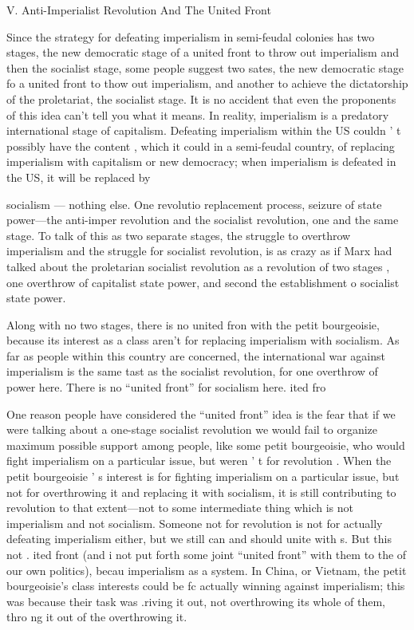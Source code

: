 \documentclass[12pt, titlepage]{article}
\begin{document}
{\begin{spacing}{1.10}
V. Anti-Imperialist Revolution And The United Front

Since the strategy for defeating imperialism in semi-feudal colonies has two stages, the new democratic stage of a united front to throw out imperialism and then the socialist stage, some people suggest two sates, the new democratic stage fo a united front to thow out imperialism, and another to achieve the dictatorship of the proletariat, the socialist stage. It is no accident that even the proponents of this idea can't tell you what it means. In reality, imperialism is a predatory international stage of capitalism. Defeating imperialism within the US couldn ' t possibly have the content , which it could in a semi-feudal country, of replacing imperialism with capitalism or new democracy; when imperialism is defeated in the US, it will be replaced by

socialism — nothing else. One revolutio replacement process, seizure of state power—the anti-imper revolution and the socialist
revolution, one and the same stage. To talk of this as two separate stages, the struggle to overthrow imperialism and the struggle for socialist revolution, is as crazy as if Marx had talked about the proletarian socialist revolution as a revolution of two stages , one overthrow of capitalist state power, and second the establishment o socialist state power.

Along with no two stages, there is no united fron with the petit bourgeoisie, because its interest as a class aren't for replacing imperialism with socialism. As far as people within this country are concerned, the international war against imperialism is the same tast as the socialist revolution, for one overthrow of power here. There is no ``united front'' for socialism here.
ited fro

One reason people have considered the ``united front'' idea is the fear that if we were talking about a one-stage socialist revolution we would fail to organize maximum possible support among people, like some petit bourgeoisie, who would fight imperialism on a particular issue, but weren ' t for revolution . When the petit bourgeoisie ' s interest is for fighting imperialism on a particular issue, but not for overthrowing it and replacing it with socialism, it is still contributing to revolution to that extent—not to some intermediate thing which is not imperialism and not socialism. Someone not for revolution is not for actually defeating imperialism either, but we still can and should unite with s. But this not . ited front (and i not put forth some joint ``united front'' with them to the of our own politics), becau imperialism as a system. In China, or Vietnam, the petit bourgeoisie's class interests could be fc actually winning against imperialism; this was because their task was .riving it out, not overthrowing its whole of them, thro ng it out of the overthrowing it.


\end{spacing}}
\end{document}
